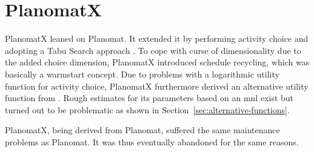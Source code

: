
\section{PlanomatX}

PlanomatX leaned on Planomat. It extended it by performing activity choice and adopting a Tabu Search approach \citep[][]{Feil_PhDThesis_2010}. To cope with curse of dimensionality due to the added choice dimension, PlanomatX introduced schedule recycling, which was basically a warmstart concept. Due to problems with a logarithmic utility function for activity choice, PlanomatX furthermore derived an alternative utility function from \citet[][]{Joh_PhDThesis_2004}. Rough estimates for its parameters based on an \gls{mnl} exist but turned out to be problematic as shown in Section~\ref{sec:alternative-functions}.


PlanomatX, being derived from Planomat, suffered the same maintenance problems as Planomat.  It was thus eventually abandoned for the same reasons.






